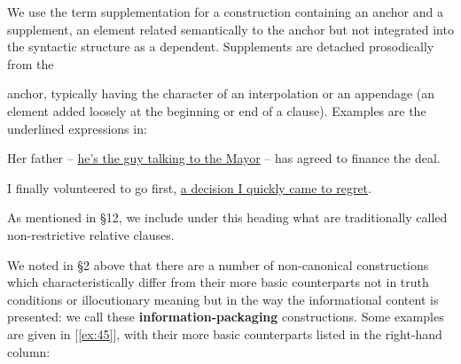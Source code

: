 We use the term {supplementation} for a construction containing an {anchor} and a {supplement}, an element related semantically to the anchor but not integrated into the syntactic structure as a dependent. Supplements are detached prosodically from the

\newpage

\noindent anchor, typically having the character of an interpolation or an appendage (an element added loosely at the beginning or end of a clause). Examples are the underlined expressions in:
\begin{examples}
\item \label{ex:44}
    \begin{examples}
        \item Her father -- \uline{he's the guy talking to the Mayor} -- has agreed to finance the deal.
        \item I finally volunteered to go first, \uline{a decision I quickly came to regret}.
    \end{examples}
\end{examples}
As mentioned in §12, we include under this heading what are traditionally called non-restrictive relative clauses.


We noted in §2 above that there are a number of non-canonical constructions which characteristically differ from their more basic counterparts not in truth conditions or illocutionary meaning but in the way the informational content is presented: we call these \textbf{information-packaging} constructions. Some examples are given in [\ref{ex:45}], with their more basic counterparts listed in the right-hand column:

